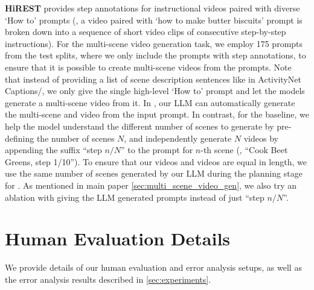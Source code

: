 \textbf{HiREST} provides step annotations for instructional videos paired with diverse `How to' prompts (\eg{}, a video paired with `how to make butter biscuits' prompt is broken down into a sequence of short video clips of consecutive step-by-step instructions).
For the multi-scene video generation task, we employ 175 prompts from the test splits,
where we only include the prompts with step annotations, to ensure that it is possible to create multi-scene videos from the prompts.
Note that instead of providing a list of scene description sentences like in ActivityNet Captions/\corefdata{}, we only give the single high-level 
`How to' prompt and let the models generate a multi-scene video from it.
In \method{}, our LLM can automatically 
generate the multi-scene \videoplan{} and video from the input prompt.
In contrast, for the \modelscope{} baseline, we help the model understand the different number of scenes to generate by
pre-defining the number of scenes $N$, and independently generate $N$ videos by appending the suffix ``step $n/N$'' to the prompt for $n$-th scene (\eg{}, ``Cook Beet Greens, step 1/10'').
To ensure that our \method{} videos and \modelscope{} videos are equal in length,
we use the same number of scenes generated by our LLM during the planning stage for \modelscope{}. As mentioned in main paper \cref{sec:multi_scene_video_gen}, we also try an ablation with giving \modelscope{} the LLM generated prompts instead of just ``step $n/N$''.









\section{Human Evaluation Details}
\label{appendix:human_eval}

We provide details of our human evaluation and error analysis setups, as well as the error analysis results described in \cref{sec:experiments}.

